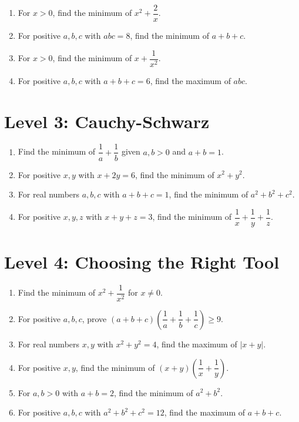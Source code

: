 \documentclass{article}
\begin{document}
\begin{enumerate}[resume]
  \item For $x > 0$, find the minimum of $x^2 + \dfrac{2}{x}$.

  \item For positive $a,b,c$ with $abc = 8$, find the minimum of $a + b + c$.

  \item For $x > 0$, find the minimum of $x + \dfrac{1}{x^2}$.

  \item For positive $a,b,c$ with $a + b + c = 6$, find the maximum of $abc$.
\end{enumerate}

\section{Level 3: Cauchy-Schwarz}

\begin{enumerate}[resume]
  \item Find the minimum of $\dfrac{1}{a} + \dfrac{1}{b}$ given $a,b > 0$ and $a + b = 1$.

  \item For positive $x,y$ with $x + 2y = 6$, find the minimum of $x^2 + y^2$.

  \item For real numbers $a,b,c$ with $a + b + c = 1$, find the minimum of $a^2 + b^2 + c^2$.

  \item For positive $x,y,z$ with $x + y + z = 3$, find the minimum of $\dfrac{1}{x} + \dfrac{1}{y} + \dfrac{1}{z}$.
\end{enumerate}

\section{Level 4: Choosing the Right Tool}

\begin{enumerate}[resume]
  \item Find the minimum of $x^2 + \dfrac{1}{x^2}$ for $x \neq 0$.

  \item For positive $a,b,c$, prove $(a + b + c)\left(\dfrac{1}{a} + \dfrac{1}{b} + \dfrac{1}{c}\right) \geq 9$.

  \item For real numbers $x,y$ with $x^2 + y^2 = 4$, find the maximum of $|x + y|$.

  \item For positive $x,y$, find the minimum of $(x + y)\left(\dfrac{1}{x} + \dfrac{1}{y}\right)$.

  \item For $a,b > 0$ with $a + b = 2$, find the minimum of $a^2 + b^2$.

  \item For positive $a,b,c$ with $a^2 + b^2 + c^2 = 12$, find the maximum of $a + b + c$.
\end{enumerate}
\end{document}

